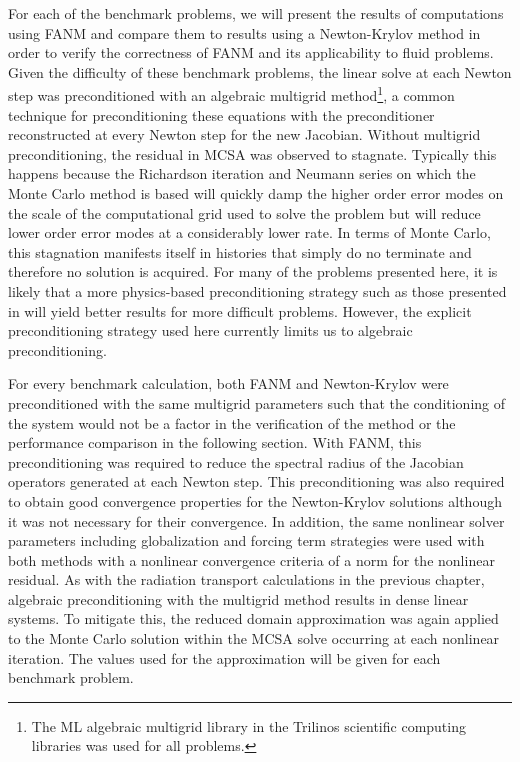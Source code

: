For each of the benchmark problems, we will present the results of
computations using FANM and compare them to results using a
Newton-Krylov method in order to verify the correctness of FANM and
its applicability to fluid problems. Given the difficulty of these
benchmark problems, the linear solve at each Newton step was
preconditioned with an algebraic multigrid method\footnote{The ML
  algebraic multigrid library in the Trilinos scientific computing
  libraries \cite{heroux_overview_2005} was used for all problems.}, a
common technique for preconditioning these equations
\cite{ghia_high-re_1982,evans_enhanced_2007} with the preconditioner
reconstructed at every Newton step for the new Jacobian. Without
multigrid preconditioning, the residual in MCSA was observed to
stagnate. Typically this happens because the Richardson iteration and
Neumann series on which the Monte Carlo method is based will quickly
damp the higher order error modes on the scale of the computational
grid used to solve the problem but will reduce lower order error modes
at a considerably lower rate. In terms of Monte Carlo, this stagnation
manifests itself in histories that simply do no terminate and
therefore no solution is acquired. For many of the problems presented
here, it is likely that a more physics-based preconditioning strategy
such as those presented in
\cite{evans_development_2006,evans_enhanced_2007} will yield better
results for more difficult problems. However, the explicit
preconditioning strategy used here currently limits us to algebraic
preconditioning.

For every benchmark calculation, both FANM and Newton-Krylov were
preconditioned with the same multigrid parameters such that the
conditioning of the system would not be a factor in the verification
of the method or the performance comparison in the following
section. With FANM, this preconditioning was required to reduce the
spectral radius of the Jacobian operators generated at each Newton
step. This preconditioning was also required to obtain good
convergence properties for the Newton-Krylov solutions although it was
not necessary for their convergence. In addition, the same nonlinear
solver parameters including globalization and forcing term strategies
were used with both methods with a nonlinear convergence criteria of a
 norm for the nonlinear residual. As with the radiation
transport calculations in the previous chapter, algebraic
preconditioning with the multigrid method results in dense linear
systems. To mitigate this, the reduced domain approximation was again
applied to the Monte Carlo solution within the MCSA solve occurring at
each nonlinear iteration. The values used for the approximation will
be given for each benchmark problem.

